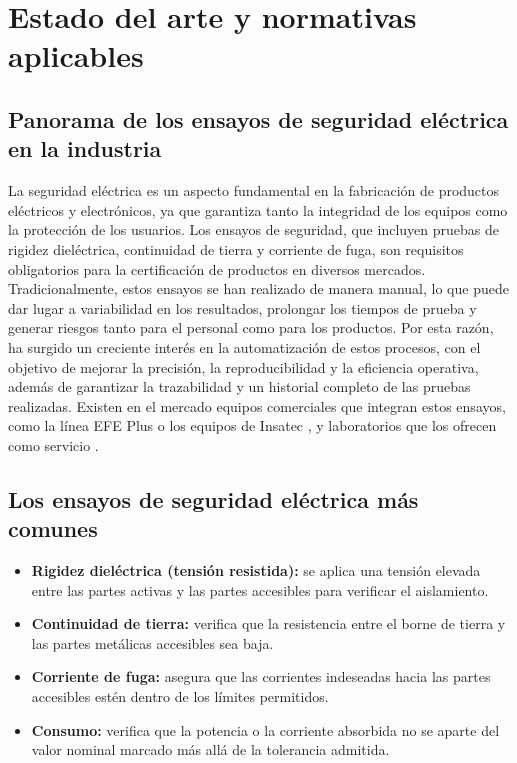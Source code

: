 \section{Estado del arte y normativas aplicables}
\label{sec:estado_arte}

\subsection{Panorama de los ensayos de seguridad eléctrica en la industria}

La seguridad eléctrica es un aspecto fundamental en la fabricación de productos
eléctricos y electrónicos, ya que garantiza tanto la integridad de los equipos como
la protección de los usuarios. Los ensayos de seguridad, que incluyen pruebas de
rigidez dieléctrica, continuidad de tierra y corriente de fuga, son requisitos
obligatorios para la certificación de productos en diversos mercados.
Tradicionalmente, estos ensayos se han realizado de manera manual, lo que puede dar
lugar a variabilidad en los resultados, prolongar los tiempos de prueba y generar
riesgos tanto para el personal como para los productos. Por esta razón, ha surgido
un creciente interés en la automatización de estos procesos, con el objetivo de
mejorar la precisión, la reproducibilidad y la eficiencia operativa, además de
garantizar la trazabilidad y un historial completo de las pruebas realizadas.
Existen en el mercado equipos comerciales que integran estos ensayos, como la
línea EFE Plus \cite{efeplus} o los equipos de Insatec \cite{insatec}, y
laboratorios que los ofrecen como servicio \cite{labconsultar}.

\subsection{Los ensayos de seguridad eléctrica más comunes}
\begin{itemize}
    \item \textbf{Rigidez dieléctrica (tensión resistida):} se aplica una tensión
          elevada entre las partes activas y las partes accesibles para verificar
          el aislamiento.
    \item \textbf{Continuidad de tierra:} verifica que la resistencia entre el
          borne de tierra y las partes metálicas accesibles sea baja.
    \item \textbf{Corriente de fuga:} asegura que las corrientes indeseadas hacia
          las partes accesibles estén dentro de los límites permitidos.
    \item \textbf{Consumo:} verifica que la potencia o la corriente absorbida no se
          aparte del valor nominal marcado más allá de la tolerancia admitida.
\end{itemize}

